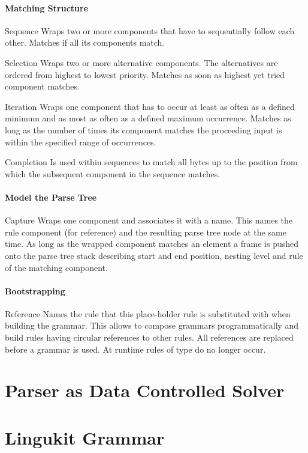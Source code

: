 \documentclass[10pt,a4paper]{article}
\begin{document}
\paragraph{Matching Structure}
\begin{rulelist}
\item[Sequence] Wraps two or more components that have to sequentially follow each other. Matches if all its components match.

\item[Selection] Wraps two or more alternative components. The alternatives are ordered from highest to lowest priority. Matches as soon as highest yet tried component matches.

\item[Iteration] Wraps one component that has to occur at least as often as a defined minimum and as most as often as a defined maximum occurrence. Matches as long as the number of times its component matches the proceeding input is within the specified range of occurrences.

\item[Completion] Is used within sequences to match all bytes up to the position from which the subsequent component in the sequence matches.
\end{rulelist}

\paragraph{Model the Parse Tree}
\begin{rulelist}
\item[Capture] Wraps one component and associates it with a name. This names the rule component (for reference) and the resulting parse tree node at the same time. As long as the wrapped component matches an element a frame is pushed onto the parse tree stack describing start and end position, nesting level and rule of the matching component.
\end{rulelist}

\paragraph{Bootstrapping}
\begin{rulelist}
\item[Reference] Names the rule that this place-holder rule is substituted with when building the grammar. This allows to compose grammars programmatically and build rules having circular references to other rules. All references are replaced before a grammar is used. At runtime rules of type do no longer occur.
\end{rulelist}

\section{Parser as Data Controlled Solver}

\section{Lingukit Grammar}
\end{document}
